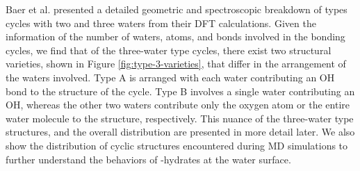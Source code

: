 Baer et al. presented a detailed geometric and spectroscopic breakdown of types  cycles with two and three waters from their DFT calculations.\cite{Baer2010} Given the information of the number of waters, atoms, and bonds involved in the bonding cycles, we find that of the three-water type  cycles, there exist two structural varieties, shown in Figure \ref{fig:type-3-varieties}, that differ in the arrangement of the waters involved. Type A is arranged with each water contributing an OH bond to the structure of the cycle. Type B involves a single water contributing an OH, whereas the other two waters contribute only the oxygen atom or the entire water molecule to the structure, respectively. This nuance of the three-water type  structures, and the overall distribution are presented in more detail later. We also show the distribution of cyclic structures encountered during MD simulations to further understand the behaviors of \suldiox-hydrates at the water surface.


